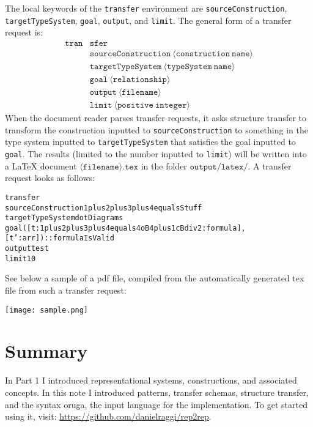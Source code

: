 \documentclass[a4paper]{article}
\theoremstyle{definition}
\begin{document}
	The local keywords of the \texttt{transfer} environment are \texttt{sourceConstruction}, \texttt{targetTypeSystem}, \texttt{goal}, \texttt{output}, and \texttt{limit}. The general form of a transfer request is:
	\begin{align*}
	\mathtt{tran}& \mathtt{sfer}\\[-3pt]
	& \mathtt{sourceConstruction\ \langle construction\ name \rangle}\\[-3pt]
	& \mathtt{targetTypeSystem\  \langle typeSystem\ name \rangle}\\[-3pt]
	& \mathtt{goal\  \langle relationship \rangle}\\[-3pt]
	& \mathtt{output\  \langle filename \rangle}\\[-3pt]
	& \mathtt{limit\  \langle positive\ integer \rangle}
	\end{align*}
	When the document reader parses transfer requests, it asks structure transfer to transform the construction inputted to \texttt{sourceConstruction} to something in the type system inputted to \texttt{targetTypeSystem} that satisfies the goal inputted to \texttt{goal}. The results (limited to the number inputted to \texttt{limit}) will be written into a LaTeX document $\mathtt{\langle filename \rangle.tex}$ in the folder $\mathtt{output/latex/}$. A transfer request looks as follows:
\begin{alltt}
transfer
    sourceConstruction 1plus2plus3plus4equalsStuff
    targetTypeSystem dotDiagrams
    goal ([t:1plus2plus3plus4equals4oB4plus1cBdiv2:formula],[t':arr]) :: formulaIsValid
    output test
    limit 10
\end{alltt}
	See below a sample of a pdf file, compiled from the automatically generated tex file from such a transfer request:
	\begin{center}
		\texttt{[image: sample.png]}
	\end{center}

\section{Summary}
In Part 1 I introduced representational systems, constructions, and associated concepts. In this note I introduced patterns, transfer schemas, structure transfer, and the syntax oruga, the input language for the implementation. To get started using it, visit: \url{https://github.com/danielraggi/rep2rep}.
\end{document}

